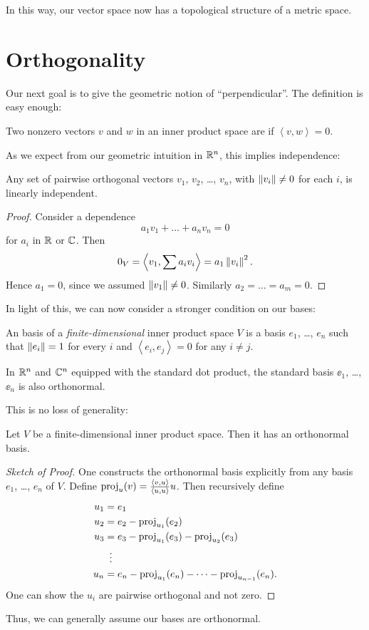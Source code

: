 In this way, our vector space now has a topological structure of a metric space.

\section{Orthogonality}
Our next goal is to give the geometric notion of ``perpendicular''.
The definition is easy enough:
\begin{definition}
	Two nonzero vectors $v$ and $w$ in an inner product space
	are  if $\left< v,w \right> = 0$.
\end{definition}

As we expect from our geometric intuition in $\mathbb R^n$,
this implies independence:
\begin{lemma}
	Any set of pairwise orthogonal vectors $v_1$, $v_2$, \dots, $v_n$,
	with $\left\lVert v_i \right\rVert \ne 0$ for each $i$,
	is linearly independent.
\end{lemma}
\begin{proof}
	Consider a dependence
	\[ a_1 v_1 + \dots + a_n v_n = 0 \]
	for $a_i$ in $\mathbb R$ or $\mathbb C$.
	Then \[ 0_V = \left< v_1, \sum a_i v_i \right> = a_1 \left\lVert v_i \right\rVert^2. \]
	Hence $a_1 = 0$, since we assumed $\left\lVert v_1 \right\rVert \neq 0$.
	Similarly $a_2 = \dots = a_m = 0$.
\end{proof}

In light of this, we can now consider a stronger condition on our bases:
\begin{definition}
	An  basis of a
	\emph{finite-dimensional} inner product space $V$
	is a basis $e_1$, \dots, $e_n$ such that
	$\left\lVert e_i \right\rVert = 1$ for every $i$ and
	$\left< e_i, e_j \right> = 0$ for any $i \neq j$.
\end{definition}
\begin{example}
	In $\mathbb R^n$ and $\mathbb C^n$ equipped with the standard dot product,
	the standard basis $\ee_1$, \dots, $\ee_n$ is also orthonormal.
\end{example}
This is no loss of generality:
\begin{theorem}
	Let $V$ be a finite-dimensional inner product space.
	Then it has an orthonormal basis.
\end{theorem}
\begin{proof}[Sketch of Proof]
	One constructs the orthonormal basis explicitly from any basis
	$e_1$, \dots, $e_n$ of $V$.
	Define $\operatorname{proj}_u(v) = \frac{\left< v,u\right>}{\left< u,u\right>} u$.
	Then recursively define
	\begin{align*}
		u_1 &= e_1 \\
		u_2 &= e_2 - \opname{proj}_{u_1}(e_2) \\
		u_3 &= e_3 - \opname{proj}_{u_1}(e_3) - \opname{proj}_{u_2}(e_3) \\
		&\vdotswithin{=} \\
		u_n &= e_n - \opname{proj}_{u_1}(e_n) - \dots - \opname{proj}_{u_{n-1}}(e_n).
	\end{align*}
	One can show the $u_i$ are pairwise orthogonal and not zero.
\end{proof}
Thus, we can generally assume our bases are orthonormal.

